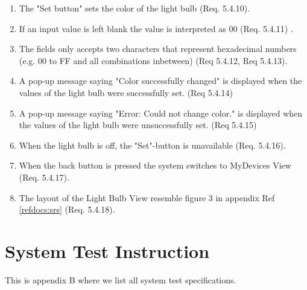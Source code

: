 \documentclass[a4paper]{article}
\newlength{\testlabellength}
\newenvironment{testlist}{\begin{enumerate}[label=\bfseries Instruction \thesubsection.\arabic* , labelindent=0pt, labelwidth=\testlabellength , leftmargin=2cm]}{\end{enumerate}}
\begin{document}
\begin{appendices}
\begin{testlist}
	\item The "Set button" sets the color of the light bulb (Req. 5.4.10).

	\item If an input value is left blank the value is interpreted as 00 (Req. 5.4.11) .   
    
    \item The fields only accepts two characters that represent hexadecimal numbers (e.g. 00 to FF and all combinations inbetween) (Req 5.4.12, Req 5.4.13).
    
    \item A pop-up message saying "Color successfully changed" is displayed when the values of the light bulb were successfully set. (Req 5.4.14)
    
    \item A pop-up message saying "Error: Could not change color." is displayed when the values of the light bulb were unsuccessfully set. (Req 5.4.15)
       
    \item When the light bulb is off, the "Set"-button is unavailable (Req. 5.4.16).
    
    \item When the back button is pressed the system switches to MyDevices View (Req. 5.4.17).
    
    \item The layout of the Light Bulb View resemble figure 3 in appendix  Ref \ref{refdocs:srs} (Req. 5.4.18).

\end{testlist}	

\newpage

\section{System Test Instruction} \label{appendix:section:systemtest}
This is appendix B where we list all system test specifications.


\end{appendices}
\end{document}
